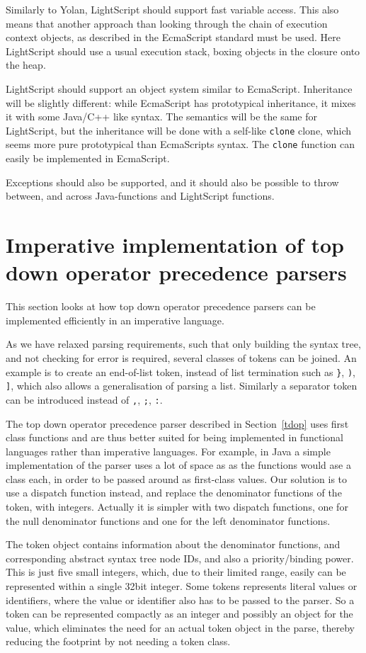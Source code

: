 \documentclass[11pt]{report}
\begin{document}
Similarly to Yolan, LightScript should support fast variable access. This also means that another approach than looking through the chain of execution context objects, as described in the EcmaScript standard must be used. Here LightScript should use a usual execution stack, boxing objects in the closure onto the heap.

LightScript should support an object system similar to EcmaScript.
Inheritance will be slightly different: while EcmaScript has prototypical inheritance, it mixes it with some Java/C++ like syntax. The semantics will be the same for LightScript, but the inheritance will be done with a self-like \verb|clone| clone, which seems more pure prototypical than EcmaScripts syntax. The \verb|clone| function can easily be implemented in EcmaScript.

Exceptions should also be supported, and it should also be possible to throw between, and across Java-functions and LightScript functions.

\section{Imperative implementation of top down operator precedence parsers}
\label{tdop-imp}
This section looks at how top down operator precedence parsers can be implemented efficiently in an imperative language.

As we have relaxed parsing requirements, such that only building the syntax tree, and not checking for error is required, several classes of tokens can be joined. An example is to create an end-of-list token, instead of list termination such as \verb|}|, \verb|)|, \verb|]|, which also allows a generalisation of parsing a list. Similarly a separator token can be introduced instead of \verb|,|, \verb|;|, \verb|:|.

The top down operator precedence parser described in Section~\ref{tdop} 
uses first class functions and are thus better suited for being implemented in functional languages rather than imperative languages.
For example, in Java a simple implementation of the parser uses a lot of space as as the functions would ase a class each, in order to be passed around as first-class values.
Our solution is to use a dispatch function instead, and replace the denominator functions of the token, with integers.
Actually it is simpler with two dispatch functions, one for the null denominator functions and one for the left denominator functions.

The token object contains information about the denominator functions, and corresponding abstract syntax tree node IDs, and also a priority/binding power.
This is just five small integers, which, due to their limited range, easily can be represented within a single 32bit integer. 
Some tokens represents literal values or identifiers, where the value or identifier also has to be passed to the parser.
So a token can be represented compactly as an integer and possibly an object for the value, which eliminates the need for an actual token object in the parse, thereby reducing the footprint by not needing a token class.
\end{document}
